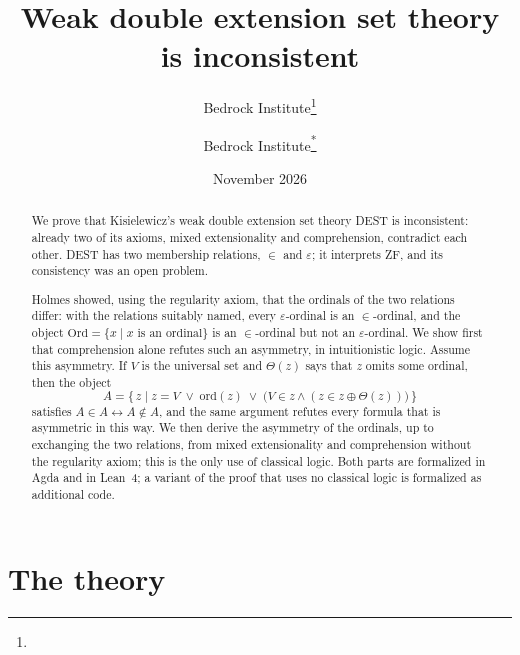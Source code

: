 \documentclass[11pt,a4paper]{article}
\title{Weak double extension set theory is inconsistent}
\author{Bedrock Institute\thanks{\authornote}}
\author{Bedrock Institute\hyperlink{titlenote}{\textsuperscript{*}}}
\date{November 2026}
\makeatletter
\newcommand{\authornote}{Corresponding author: Peter Zhang, \href{mailto:peterzhangsg@gmail.com}{peterzhangsg@gmail.com}\newline
Code and formal proofs: \href{https://github.com/BedrockInstitute/DESTInconsistency}{\texttt{github.com/BedrockInstitute/DESTInconsistency}}\newline
\textcopyright\ 2026 Bedrock Institute. Licensed under CC BY-NC-SA 4.0.}
\newcommand{\titlenote}[1]{}
\newcommand{\titlenote}[1]{\footnotetext[1]{\raisebox{\ht\strutbox}{\hypertarget{titlenote}{}}#1}\setcounter{footnote}{1}}
\theoremstyle{definition}
\theoremstyle{remark}
\newcommand{\eps}{\varepsilon}
\newcommand{\ord}{\mathrm{ord}}
\newcommand{\Ord}{\mathrm{Ord}}
\newcommand{\DEST}{\textup{DEST}}
\makeatother
\begin{document}
\maketitle
\titlenote{\authornote}

\begin{abstract}
We prove that Kisielewicz's weak double extension set theory \DEST{} is inconsistent: already two of its axioms, mixed extensionality and comprehension, contradict each other. \DEST{} has two membership relations, $\in$ and $\eps$; it interprets ZF, and its consistency was an open problem.

Holmes showed, using the regularity axiom, that the ordinals of the two relations differ: with the relations suitably named, every $\eps$-ordinal is an $\in$-ordinal, and the object $\Ord = \{x \mid x \text{ is an ordinal}\}$ is an $\in$-ordinal but not an $\eps$-ordinal. We show first that comprehension alone refutes such an asymmetry, in intuitionistic logic. Assume this asymmetry. If $V$ is the universal set and $\Theta(z)$ says that $z$ omits some ordinal, then the object
\[
  A = \{\, z \mid z = V \;\vee\; \ord(z) \;\vee\; \bigl(V \in z \wedge (z \in z \oplus \Theta(z))\bigr) \,\}
\]
satisfies $A \in A \leftrightarrow A \notin A$, and the same argument refutes every formula that is asymmetric in this way. We then derive the asymmetry of the ordinals, up to exchanging the two relations, from mixed extensionality and comprehension without the regularity axiom; this is the only use of classical logic. Both parts are formalized in Agda and in Lean~4; a variant of the proof that uses no classical logic is formalized as additional code.
\end{abstract}

\section{The theory}\label{sec:1}
\end{document}
